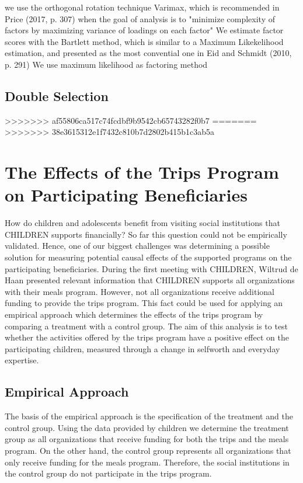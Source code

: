 \documentclass[12pt, a4paper, titlepage]{article}\usepackage[]{graphicx}\usepackage[]{color}
\begin{document}
we use the orthogonal rotation technique Varimax, which is recommended in Price (2017, p. 307) when the goal of analysis is to "minimize complexity of factors by maximizing variance of loadings on each factor" 
We estimate factor scores with the Bartlett method, which is similar to a Maximum Likekelihood estimation, and presented as the most convential one in Eid and Schmidt (2010, p. 291)
We use maximum likelihood as factoring method



\subsection{Double Selection}

>>>>>>> af55806ca517c74fcdbf9b9542cb65743282f0b7
=======
>>>>>>> 38e3615312e1f7432c810b7d2802b415b1c3ab5a
\section{The Effects of the Trips Program on Participating Beneficiaries}

How do children and adolescents benefit from visiting social institutions that CHILDREN supports financially? So far this question could not be empirically validated. Hence, one of our biggest challenges was determining a possible solution for measuring potential causal effects of the supported programs on the participating beneficiaries. During the first meeting with CHILDREN, Wiltrud de Haan presented relevant information that CHILDREN supports all organizations with their meals program. However, not all organizations receive additional funding to provide the trips program. This fact could be used for applying an empirical approach which determines the effects of the trips program by comparing a treatment with a control group. The aim of this analysis is to test whether the activities offered by the trips program have a positive effect on the participating children, measured through a change in selfworth and everyday expertise. 

\subsection{Empirical Approach}

The basis of the empirical approach is the specification of the treatment and the control group. Using the data provided by children we determine the treatment group as all organizations that receive funding for both the trips and the meals program. On the other hand, the control group represents all organizations that only receive funding for the meals program. Therefore, the social institutions in the control group do not participate in the trips program.
\end{document}
